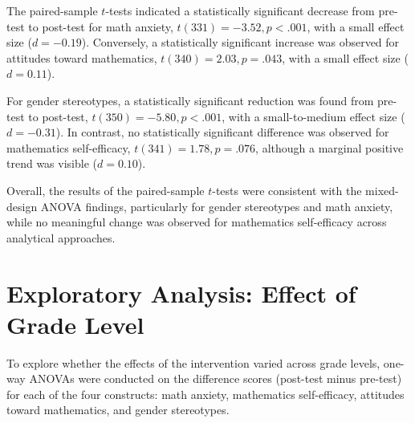 The paired-sample $t$-tests indicated a statistically significant decrease from pre-test to post-test for math anxiety, $t(331) = -3.52, p < .001$, with a small effect size ($d = -0.19$). Conversely, a statistically significant increase was observed for attitudes toward mathematics, $t(340) = 2.03, p = .043$, with a small effect size ($d = 0.11$).

For gender stereotypes, a statistically significant reduction was found from pre-test to post-test, $t(350) = -5.80, p < .001$, with a small-to-medium effect size ($d = -0.31$). In contrast, no statistically significant difference was observed for mathematics self-efficacy, $t(341) = 1.78, p = .076$, although a marginal positive trend was visible ($d = 0.10$).

Overall, the results of the paired-sample $t$-tests were consistent with the mixed-design ANOVA findings, particularly for gender stereotypes and math anxiety, while no meaningful change was observed for mathematics self-efficacy across analytical approaches.

\section{Exploratory Analysis: Effect of Grade Level}

To explore whether the effects of the intervention varied across grade levels, one-way ANOVAs were conducted on the difference scores (post-test minus pre-test) for each of the four constructs: math anxiety, mathematics self-efficacy, attitudes toward mathematics, and gender stereotypes.

